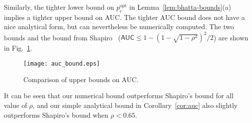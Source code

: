 \documentclass[conference,letterpaper]{IEEEtran}
\newcommand{\figWidth}{0.48\textwidth}%
\newcommand{\errorOpt}{p_e^{\mathrm{opt}}}
\begin{document}
{Similarly, the tighter lower bound on $\errorOpt$ in
Lemma~\ref{lem:bhatta-bounds}(a) implies a tighter upper bound on AUC.
The tighter AUC bound does not have a nice analytical form, but can
nevertheless be numerically computed.  The two bounds and the bound
from Shapiro~\cite{Shapiro99}
($\mathsf{AUC} \le 1 - (1 - \sqrt{1 - \rho^2})^2 / 2$) are shown in
Fig.~\ref{fig:auc}.
\begin{figure}[thbp]
  \centering
  \texttt{[image: auc\_bound.eps]}
  \caption{Comparison of upper bounds on AUC.}
  \label{fig:auc}
\end{figure}%
It can be seen that our numerical bound outperforms Shapiro's bound
for all value of $\rho$, and our simple analytical bound in
Corollary~\ref{cor:auc} also slightly outperforms Shapiro's bound when
$\rho < 0.65$.
}
\end{document}
